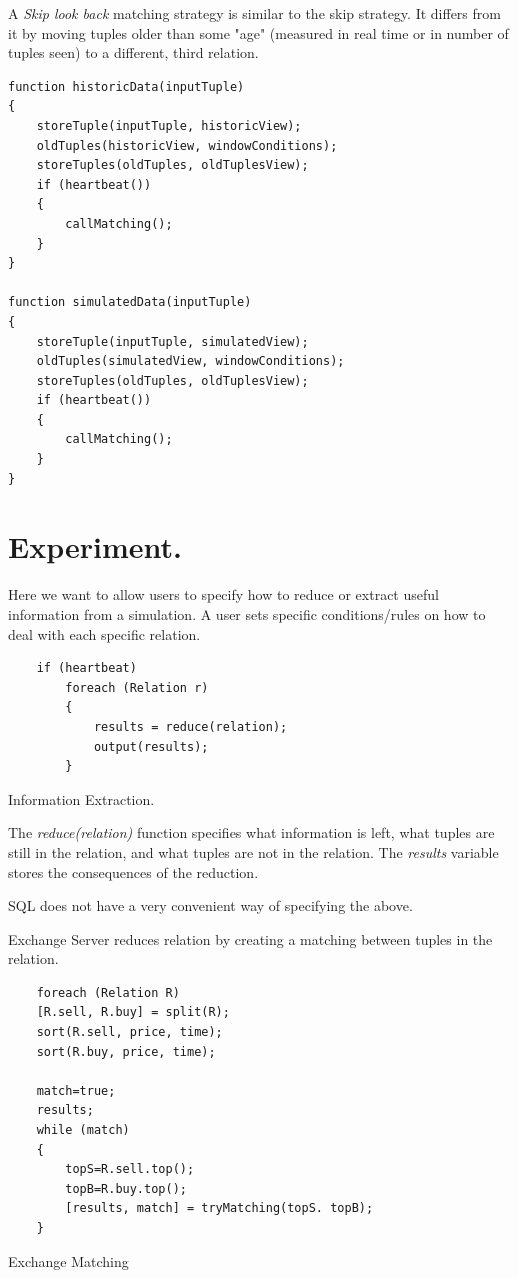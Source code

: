 \documentclass{article}
\begin{document}
\noindent A \emph{Skip look back} matching strategy is similar to the skip strategy. It differs from it by moving tuples older than some "age" (measured in real time or in number of tuples seen) to a different, third relation.
\begin{verbatim}   
function historicData(inputTuple)
{
    storeTuple(inputTuple, historicView);
    oldTuples(historicView, windowConditions);
    storeTuples(oldTuples, oldTuplesView);
    if (heartbeat())
    {
        callMatching();
    }
}

function simulatedData(inputTuple)
{
    storeTuple(inputTuple, simulatedView);
    oldTuples(simulatedView, windowConditions);
    storeTuples(oldTuples, oldTuplesView);
    if (heartbeat())
    {
        callMatching();
    }
}
\end{verbatim}

\section{Experiment.}

Here we want to allow users to specify how to reduce or extract useful information from a simulation. A user sets specific conditions/rules on how to deal with each specific relation. 

\begin{program}
    \begin{verbatim}  
    if (heartbeat) 
        foreach (Relation r)
        {
            results = reduce(relation);
            output(results);
        }
    \end{verbatim}
\caption{Information Extraction.}
\end{program}

The \emph{reduce(relation)} function specifies what information is left, what tuples are still in the relation, and what tuples are not in the relation. The \emph{results} variable stores the consequences of the reduction. 

SQL does not have a very convenient way of specifying the above.

Exchange Server reduces relation by creating a matching between tuples in the relation.

\begin{program}
    \begin{verbatim}  
    foreach (Relation R)
    [R.sell, R.buy] = split(R);
    sort(R.sell, price, time);
    sort(R.buy, price, time);
    
    match=true;
    results;
    while (match)
    {
        topS=R.sell.top();
        topB=R.buy.top();
        [results, match] = tryMatching(topS. topB);
    }
    \end{verbatim}
\caption{Exchange Matching}
\end{program}
\end{document}
